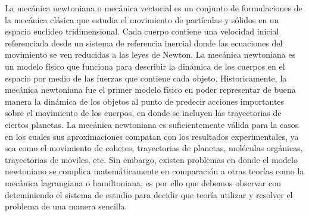 La mecánica newtoniana o mecánica vectorial es un conjunto de formulaciones de la mecánica clásica que estudia el movimiento de partículas
y sólidos en un espacio euclideo tridimensional. Cada cuerpo contiene una velocidad inicial referenciada desde un sistema de referencia inercial
donde las ecuaciones del movimiento se ven reducidas a las leyes de Newton. La mecánica newtoniana es un modelo físico que funciona para 
describir la dinámica de los cuerpos en el espacio por medio de las fuerzas que contiene cada objeto. Historicamente, la mecánica newtoniana
fue el primer modelo físico en poder representar de buena manera la dinámica de los objetos al punto de predecir acciones importantes sobre el movimiento
de los cuerpos, en donde se incluyen las trayectorias de ciertos planetas. La mecánica newtoniana es suficientemente válida para la casos en los cuales
sus aproximaciones compatan con los resultados experimentales, ya sea como el movimiento de cohetes, trayectorias de planetas, moléculas orgánicas, trayectorias de moviles, etc. Sin embargo,
existen problemas en donde el modelo newtoniano se complica matemáticamente en comparación a otras teorías como la mecánica lagrangiana o hamiltoniana, es por ello
que debemos observar con deteminiendo el sistema de estudio para decidir que teoría utilizar y resolver el problema de una manera sencilla.